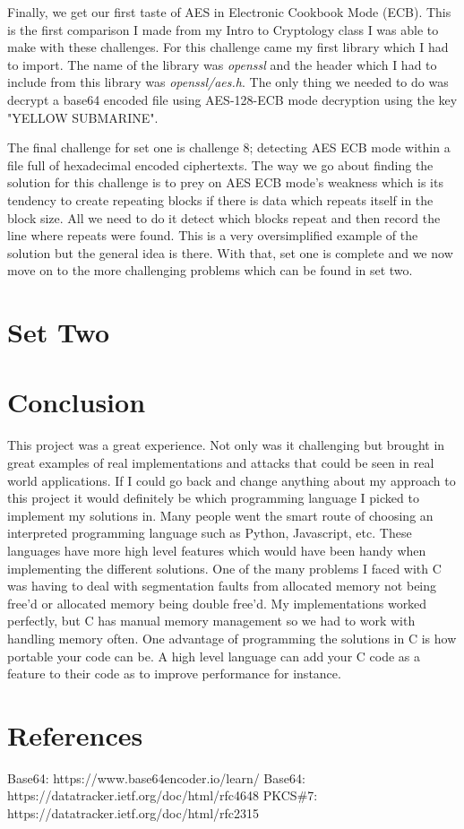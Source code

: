 \documentclass{report}
\begin{document}
		Finally, we get our first taste of AES in Electronic Cookbook Mode (ECB). This is the first comparison I made from my Intro to Cryptology class I was able to make with these challenges. For this challenge came my first library which I had to import. The name of the library was \textit{openssl} and the header which I had to include from this library was \textit{openssl/aes.h}. The only thing we needed to do was decrypt a base64 encoded file using AES-128-ECB mode decryption using the key "YELLOW SUBMARINE".
		\par
		The final challenge for set one is challenge 8; detecting AES ECB mode within a file full of hexadecimal encoded ciphertexts. The way we go about finding the solution for this challenge is to prey on AES ECB mode's weakness which is its tendency to create repeating blocks if there is data which repeats itself in the block size. All we need to do it detect which blocks repeat and then record the line where repeats were found. This is a very oversimplified example of the solution but the general idea is there. With that, set one is complete and we now move on to the more challenging problems which can be found in set two.
		
	\section*{Set Two}
			
		
	\pagebreak
	\section*{Conclusion}
		This project was a great experience. Not only was it challenging but brought in great examples of real implementations and attacks that could be seen in real world applications. If I could go back and change anything about my approach to this project it would definitely be which programming language I picked to implement my solutions in. Many people went the smart route of choosing an interpreted programming language such as Python, Javascript, etc. These languages have more high level features which would have been handy when implementing the different solutions. One of the many problems I faced with C was having to deal with segmentation faults from allocated memory not being free'd or allocated memory being double free'd. My implementations worked perfectly, but C has manual memory management so we had to work with handling memory often. One advantage of programming the solutions in C is how portable your code can be. A high level language can add your C code as a feature to their code as to improve performance for instance. 
		
	\pagebreak
	\section*{References}
		Base64: https://www.base64encoder.io/learn/ \newline
		Base64: https://datatracker.ietf.org/doc/html/rfc4648 \newline
		PKCS\#7: https://datatracker.ietf.org/doc/html/rfc2315 \newline
	
\end{document}
